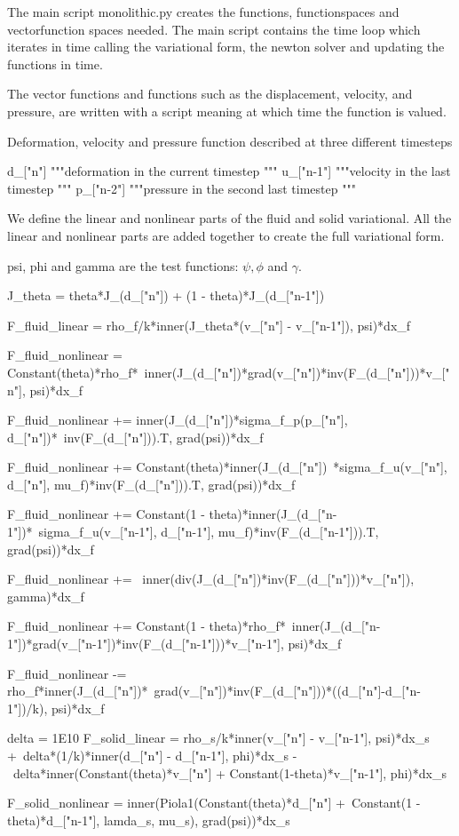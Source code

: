 The main script monolithic.py creates the functions, functionspaces and vectorfunction spaces needed. The main script contains the time loop which iterates in time calling the variational form, the newton solver and updating the functions in time. 

The vector functions and functions such as the displacement, velocity, and pressure, are written with a script  meaning at which time the function is valued. 
\begin{python}\caption{Deformation, velocity and pressure function described at three different timesteps }
d_["n"]  """deformation in the current timestep """
u_["n-1"] """velocity in the last timestep """
p_["n-2"] """pressure in the second last timestep """
\end{python}

We define the linear and nonlinear parts of the fluid and solid variational. All the linear and nonlinear parts are added together to create the full variational form.

psi, phi and gamma are the test functions: $\psi, \phi$ and $\gamma$.
\newpage
\begin{python}
J_theta = theta*J_(d_["n"]) + (1 - theta)*J_(d_["n-1"]) 

F_fluid_linear = rho_f/k*inner(J_theta*(v_["n"] - v_["n-1"]), psi)*dx_f

F_fluid_nonlinear =  Constant(theta)*rho_f*\
inner(J_(d_["n"])*grad(v_["n"])*inv(F_(d_["n"]))*v_["n"], psi)*dx_f

F_fluid_nonlinear += inner(J_(d_["n"])*sigma_f_p(p_["n"], d_["n"])*\
inv(F_(d_["n"])).T, grad(psi))*dx_f

F_fluid_nonlinear += Constant(theta)*inner(J_(d_["n"])\
*sigma_f_u(v_["n"], d_["n"], mu_f)*inv(F_(d_["n"])).T, grad(psi))*dx_f

F_fluid_nonlinear += Constant(1 - theta)*inner(J_(d_["n-1"])*\
sigma_f_u(v_["n-1"], d_["n-1"], mu_f)*inv(F_(d_["n-1"])).T, grad(psi))*dx_f

F_fluid_nonlinear += \
inner(div(J_(d_["n"])*inv(F_(d_["n"]))*v_["n"]), gamma)*dx_f

F_fluid_nonlinear += Constant(1 - theta)*rho_f*\
inner(J_(d_["n-1"])*grad(v_["n-1"])*inv(F_(d_["n-1"]))*v_["n-1"], psi)*dx_f

F_fluid_nonlinear -= rho_f*inner(J_(d_["n"])*\
grad(v_["n"])*inv(F_(d_["n"]))*((d_["n"]-d_["n-1"])/k), psi)*dx_f

delta = 1E10
F_solid_linear = rho_s/k*inner(v_["n"] - v_["n-1"], psi)*dx_s +\
delta*(1/k)*inner(d_["n"] - d_["n-1"], phi)*dx_s -\
delta*inner(Constant(theta)*v_["n"] + Constant(1-theta)*v_["n-1"], phi)*dx_s

F_solid_nonlinear = inner(Piola1(Constant(theta)*d_["n"] +\
Constant(1 - theta)*d_["n-1"], lamda_s, mu_s), grad(psi))*dx_s
\end{python}


